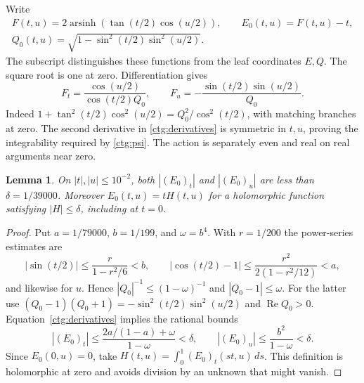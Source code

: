 \documentclass[11pt]{article}
\numberwithin{equation}{section}
\newtheorem{lemma}[theorem]{Lemma}
\theoremstyle{definition}
\theoremstyle{remark}
\newcommand{\Rea}{\operatorname{Re}}
\newcommand{\arsinh}{\operatorname{arsinh}}
\begin{document}
Write
\begin{equation}\label{ctg:error}
\begin{gathered}
 F(t,u)=2\arsinh\!\left(\tan(t/2)\cos(u/2)\right),\qquad
 E_0(t,u)=F(t,u)-t,\\
 Q_0(t,u)=\sqrt{1-\sin^2(t/2)\sin^2(u/2)}.
\end{gathered}
\end{equation}
The subscript distinguishes these functions from the leaf coordinates
$E,Q$. The square root is one at zero. Differentiation gives
\begin{equation}\label{ctg:derivatives}
 F_t=\frac{\cos(u/2)}{\cos(t/2)Q_0},\qquad
 F_u=-\frac{\sin(t/2)\sin(u/2)}{Q_0}.
\end{equation}
Indeed $1+\tan^2(t/2)\cos^2(u/2)=Q_0^2/\cos^2(t/2)$,
with matching branches at zero. The second derivative in
\eqref{ctg:derivatives} is symmetric in $t,u$, proving the
integrability required by \eqref{ctg:psi}. The action is separately
even and real on real arguments near zero.

\begin{lemma}\label{ctg:error-bound}
On $|t|,|u|\le10^{-2}$, both $|(E_0)_t|$ and $|(E_0)_u|$ are less
than $\delta=1/39000$. Moreover $E_0(t,u)=tH(t,u)$ for a holomorphic
function satisfying $|H|\le\delta$, including at $t=0$.
\end{lemma}

\begin{proof}
Put $a=1/79000$, $b=1/199$, and $\omega=b^4$. With $r=1/200$ the
power-series estimates are
\[
 |\sin(t/2)|\le\frac{r}{1-r^2/6}<b,\qquad
 |\cos(t/2)-1|\le\frac{r^2}{2(1-r^2/12)}<a,
\]
and likewise for $u$. Hence $|Q_0|^{-1}\le(1-\omega)^{-1}$ and
$|Q_0-1|\le\omega$. For the latter use
$(Q_0-1)(Q_0+1)=-\sin^2(t/2)\sin^2(u/2)$ and
$\Rea Q_0>0$. Equation~\eqref{ctg:derivatives} implies the rational
bounds
\begin{equation}\label{ctg:rational-bounds}
 |(E_0)_t|\le\frac{2a/(1-a)+\omega}{1-\omega}<\delta,
 \qquad |(E_0)_u|\le\frac{b^2}{1-\omega}<\delta.
\end{equation}
Since $E_0(0,u)=0$, take
$H(t,u)=\int_0^1(E_0)_t(st,u)\,ds$. This definition is holomorphic
at zero and avoids division by an unknown that might vanish.
\end{proof}
\end{document}
